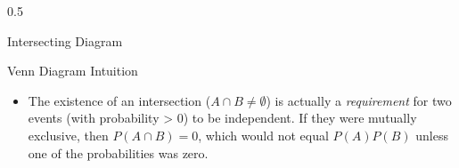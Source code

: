 \begin{frame}
\begin{columns}[T]
\begin{column}{0.5\textwidth}
\begin{block}{Intersecting Diagram}
            \end{block}
            \vspace{-0.5mm}
            \begin{block}{Venn Diagram Intuition}
            \begin{itemize}
                \item The existence of an intersection (\(A \cap B \neq \emptyset\)) is actually a \textit{requirement} for two events (with probability > 0) to be independent. If they were mutually exclusive, then \(P(A \cap B)=0\), which would not equal \(P(A)P(B)\) unless one of the probabilities was zero.
            \end{itemize}
            \end{block}
        \end{column}
    \end{columns}
\end{frame}

